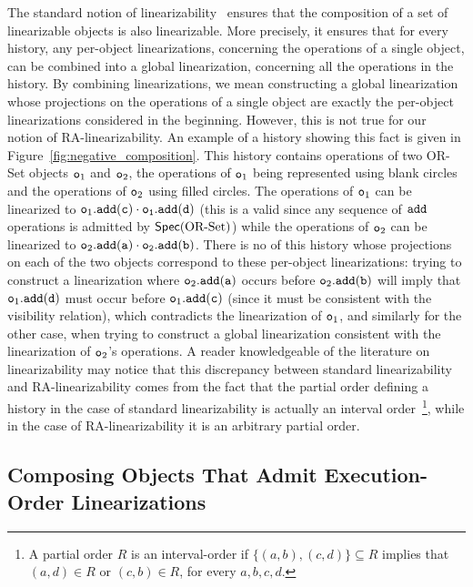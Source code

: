 The standard notion of linearizability~\cite{HerlihyW90} ensures that the composition of a set of linearizable objects is also linearizable. More precisely, it ensures that for every history, any per-object linearizations, concerning the operations of a single object, can be combined into a global linearization, concerning all the operations in the history. By combining linearizations, we mean constructing a global linearization whose projections on the operations of a single object are exactly the per-object linearizations considered in the beginning.
However, this is not true for our notion of RA-linearizability. An example of a history showing this fact is given in Figure~\ref{fig:negative_composition}. This history contains operations of two OR-Set objects $\mathtt{o}_1$ and $\mathtt{o}_2$, the operations of $\mathtt{o}_1$ being represented using blank circles and the operations of $\mathtt{o}_2$ using filled circles. The operations of $\mathtt{o}_1$ can be linearized to $\aobj_1.\alabelshort[{\tt add}]{c}\cdot \aobj_1.\alabelshort[{\tt add}]{d}$ (this is a valid \crdtlinearization{} since any sequence of ${\tt add}$ operations is admitted by $\mathsf{Spec}(\text{OR\text{-}Set})$) while the operations of $\mathtt{o}_2$ can be linearized to $\aobj_2.\alabelshort[{\tt add}]{a}\cdot \aobj_2.\alabelshort[{\tt add}]{b}$. There is no \crdtlinearization{} of this history whose projections on each of the two objects correspond to these per-object linearizations: trying to construct a linearization where $\aobj_2.\alabelshort[{\tt add}]{a}$ occurs before $\aobj_2.\alabelshort[{\tt add}]{b}$ will imply that $\aobj_1.\alabelshort[{\tt add}]{d}$ must occur before $\aobj_1.\alabelshort[{\tt add}]{c}$ (since it must be consistent with the visibility relation), which contradicts the linearization of $\mathtt{o}_1$, and similarly for the other case, when trying to construct a global linearization consistent with the linearization of $\mathtt{o}_2$'s operations. A reader knowledgeable of the literature on linearizability may notice that this discrepancy between standard linearizability and RA-linearizability comes from the fact that the partial order defining a history in the case of standard linearizability is actually an interval order~\footnote{A partial order $R$ is an interval-order if $\{(a,b), (c,d)\} \subseteq R$ implies that $(a,d) \in R$ or $(c,b) \in R$, for every $a,b,c,d$.}, while in the case of RA-linearizability it is an arbitrary partial order.


\subsection{Composing Objects That Admit Execution-Order Linearizations}

